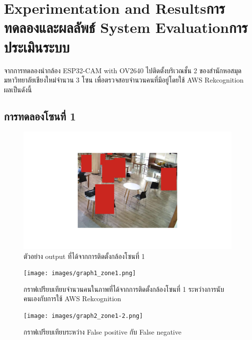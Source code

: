 \chapter{\ifproject%
\ifenglish Experimentation and Results\else การทดลองและผลลัพธ์\fi
\else%
\ifenglish System Evaluation\else การประเมินระบบ\fi
\fi}
\hspace{10mm} จากการทดลองนำกล้อง ESP32-CAM with OV2640 ไปติดตั้งบริเวณชั้น 2 ของสำนักหอสมุดมหาวิทยาลัยเชียงใหม่จำนวน 3 โซน เพื่อตรวจสอบจำนวนคนที่มีอยู่โดยใช้ AWS Rekcognition ผลเป็นดังนี้

\section{การทดลองโซนที่ 1}
\begin{figure}[ht]
    \includegraphics[width=\textwidth]{images/modified_Picture (100).png}
    \caption[ตัวอย่าง output ที่ได้จากการติดตั้งกล้องโซนที่ 1]{ตัวอย่าง output ที่ได้จากการติดตั้งกล้องโซนที่ 1}
    \label{fig:output1}
\end{figure}
\newpage
\begin{figure}[ht]
    \centering
    \texttt{[image: images/graph1\_zone1.png]}
    \caption[กราฟเปรียบเทียบจำนวนคนในภาพที่ได้จากการติดตั้งกล้องโซนที่ 1 ระหว่างการนับคนเองกับการใช้ AWS Rekcognition]{กราฟเปรียบเทียบจำนวนคนในภาพที่ได้จากการติดตั้งกล้องโซนที่ 1 ระหว่างการนับคนเองกับการใช้ AWS Rekcognition}
    \label{fig:graph1-1}
\end{figure}
\newpage
\begin{figure}[ht]
    \centering
    \texttt{[image: images/graph2\_zone1-2.png]}
    \caption[กราฟเปรียบเทียบระหว่าง False positive กับ False negative]{กราฟเปรียบเทียบระหว่าง False positive กับ False negative}
    \label{fig:graph2-1}
\end{figure}

